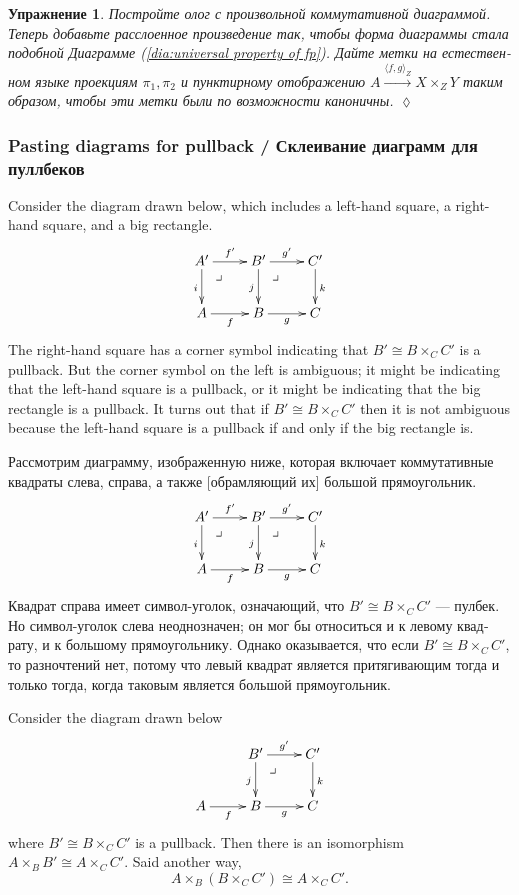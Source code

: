 \documentclass[a4paper]{book}
\makeatletter
\def\iso{\cong}
\def\la{\langle}
\def\ra{\rangle}
\def\ullimit{\ar@{}[rd]|(.3)*+{\lrcorner}}
\newcommand{\To}[1]{\xrightarrow{#1}}
\newcommand{\prodmap}[2]{\la#1,#2\ra}
\newcommand{\pb}[3]{\prodmap{#1}{#2}_{#3}}
\theoremstyle{myth}
\newtheorem{propositionENG}[envENG]{\begin{english}Proposition\end{english}}
\newtheorem{excRUS}[envRUS]{Упражнение}
\newenvironment{exerciseRUS}{\begin{excRUS}}{\hspace*{\fill}$\lozenge$\end{excRUS}}
\makeatother
\begin{document}
\begin{russian}
\begin{exerciseRUS}
Постройте олог с произвольной коммутативной диаграммой. Теперь добавьте расслоенное произведение так, чтобы форма диаграммы стала подобной Диаграмме (\ref{dia:universal property of fp}). Дайте метки на естественном языке проекциям $\pi_1,\pi_2$ и пунктирному отображению $A\To{\pb{f}{g}{Z}}X\times_ZY$ таким образом, чтобы эти метки были по возможности каноничны.
\end{exerciseRUS}


\subsubsection{Pasting diagrams for pullback / Склеивание диаграмм для пуллбеков}

Consider the diagram drawn below, which includes a left-hand square, a right-hand square, and a big rectangle.
$$
\xymatrix{
A'\ar[r]^{f'}\ar[d]_i\ullimit&B'\ar[r]^{g'}\ar[d]_j\ullimit&C'\ar[d]^k\\
A\ar[r]_f&B\ar[r]_g&C}
$$
The right-hand square has a corner symbol indicating that $B'\iso B\times_CC'$ is a pullback. But the corner symbol on the left is ambiguous; it might be indicating that the left-hand square is a pullback, or it might be indicating that the big rectangle is a pullback. It turns out that if $B'\iso B\times_CC'$ then it is not ambiguous because the left-hand square is a pullback if and only if the big rectangle is.

Рассмотрим диаграмму, изображенную ниже, которая включает коммутативные квадраты слева, справа, а также [обрамляющий их] большой прямоугольник.
$$
\xymatrix{
A'\ar[r]^{f'}\ar[d]_i\ullimit&B'\ar[r]^{g'}\ar[d]_j\ullimit&C'\ar[d]^k\\
A\ar[r]_f&B\ar[r]_g&C}
$$
Квадрат справа имеет символ-уголок, означающий, что $B'\iso B\times_CC'$ — пулбек. Но символ-уголок слева неоднозначен; он мог бы относиться и к левому квадрату, и к большому прямоугольнику. Однако оказывается, что если $B'\iso B\times_CC'$, то разночтений нет, потому что левый квадрат является притягивающим тогда и только тогда, когда таковым является большой прямоугольник.

\begin{propositionENG}\label{prop:pasting}
Consider the diagram drawn below
$$
\xymatrix{
&B'\ar[r]^{g'}\ar[d]_j\ullimit&C'\ar[d]^k\\
A\ar[r]_f&B\ar[r]_g&C}
$$
where $B'\iso B\times_CC'$ is a pullback. Then there is an isomorphism $A\times_BB'\iso A\times_CC'$. Said another way, $$A\times_B(B\times_CC')\iso A\times_CC'.$$
\end{propositionENG}


\end{russian}
\end{document}
